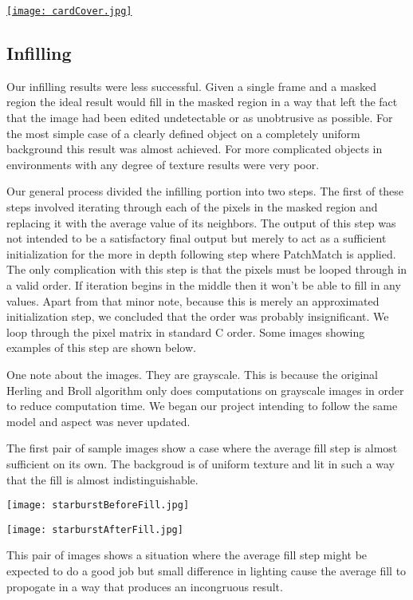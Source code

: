 \documentclass[12pt]{article}
\begin{document}
\href{https://www.youtube.com/watch?v=DBMAxPnzEjU&feature=youtu.be}{\texttt{[image: cardCover.jpg]}}

\subsection{Infilling}
Our infilling results were less successful. Given a single frame and a masked region the ideal result would fill in the masked region in a way that left the fact that the image had been edited undetectable or as unobtrusive as possible. For the most simple case of a clearly defined object on a completely uniform background this result was almost achieved. For more complicated objects in environments with any degree of texture results were very poor.

Our general process divided the infilling portion into two steps. The first of these steps involved iterating through each of the pixels in the masked region and replacing it with the average value of its neighbors. The output of this step was not intended to be a satisfactory final output but merely to act as a sufficient initialization for the more in depth following step where PatchMatch is applied. The only complication with this step is that the pixels must be looped through in a valid order. If iteration begins in the middle then it won't be able to fill in any values. Apart from that minor note, because this is merely an approximated initialization step, we concluded that the order was probably insignificant. We loop through the pixel matrix in standard C order. Some images showing examples of this step are shown below. 

One note about the images. They are grayscale. This is because the original Herling and Broll algorithm only does computations on grayscale images in order to reduce computation time. We began our project intending to follow the same model and aspect was never updated. 

The first pair of sample images show a case where the average fill step is almost sufficient on its own. The backgroud is of uniform texture and lit in such a way that the fill is almost indistinguishable.

\begin{center}
\texttt{[image: starburstBeforeFill.jpg]}

\texttt{[image: starburstAfterFill.jpg]}
\end{center}

This pair of images shows a situation where the average fill step might be expected to do a good job but small difference in lighting cause the average fill to propogate in a way that produces an incongruous result.
\end{document}

